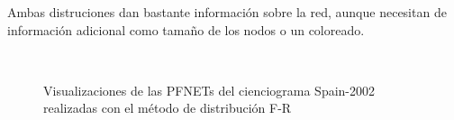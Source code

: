 \documentclass[10pt,a4paper,spanish]{article}
\numberwithin{equation}{section} %
\numberwithin{figure}{section} %
\numberwithin{table}{section} %
\begin{document}
Ambas distruciones dan bastante información sobre la red, aunque necesitan de información adicional como tamaño de los nodos o un coloreado.

\begin{figure}[!h]
    \centering
    \mbox{
    }
    \mbox{
    }
    \caption{Visualizaciones de las PFNETs del cienciograma Spain-2002 realizadas con el método de distribución F-R}
    \label{frsp}
\end{figure}
\end{document}
